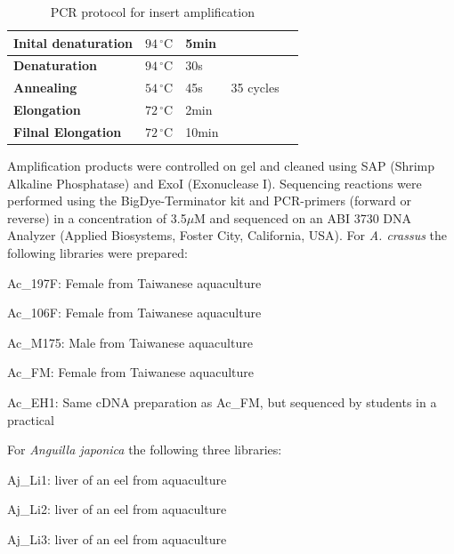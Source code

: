 \documentclass[12pt,a4paper]{article}
\begin{document}
\begin{table}[ht]
  \centering
  \begin{tabular}{lllll} 
    \textbf{Inital denaturation} &  $ 94\, ^{\circ}\mathrm{C} $ & 5min &  &\\ 
    \hline
    \textbf{Denaturation} &  $ 94\, ^{\circ}\mathrm{C} $ &30s& & \\ 
    \textbf{Annealing} &   $ 54\, ^{\circ}\mathrm{C} $ & 45s & 35 cycles &\\ 
    \textbf{Elongation} &   $ 72\, ^{\circ}\mathrm{C} $ & 2min &  &\\ 
    \hline
    \textbf{Filnal Elongation} &   $ 72\, ^{\circ}\mathrm{C} $ & 10min &\\ 
  \end{tabular}   
  \caption{PCR protocol for insert amplification}
  \label{tab:PCR}
\end{table}

Amplification products were controlled on gel and cleaned using SAP
(Shrimp Alkaline Phosphatase) and ExoI (Exonuclease I). Sequencing
reactions were performed using the BigDye-Terminator kit and
PCR-primers (forward or reverse) in a concentration of 3.5$\mu$M and
sequenced on an ABI 3730 DNA Analyzer (Applied Biosystems, Foster
City, California, USA).  For \textit{A. crassus} the following
libraries were prepared:
 
\begin{list}{}{\leftmargin = 5em}
  \setlength{\itemsep}{1pt} \setlength{\parskip}{1pt}
  \setlength{\parsep}{0pt}
\item[Ac\_197F:] Female from Taiwanese aquaculture
\item[Ac\_106F:] Female from Taiwanese aquaculture
\item[Ac\_M175:] Male from Taiwanese aquaculture
\item[Ac\_FM:] Female from Taiwanese aquaculture
\item[Ac\_EH1:] Same cDNA preparation as Ac\_FM, but sequenced by
  students in a practical
\end{list}

For \textit{Anguilla japonica} the following three libraries:
\begin{list}{}{\leftmargin = 5em}
  \setlength{\itemsep}{1pt} \setlength{\parskip}{1pt}
  \setlength{\parsep}{0pt}
\item[Aj\_Li1:] liver of an eel from aquaculture
\item[Aj\_Li2:] liver of an eel from aquaculture
\item[Aj\_Li3:] liver of an eel from aquaculture
\end{list}
\end{document}
